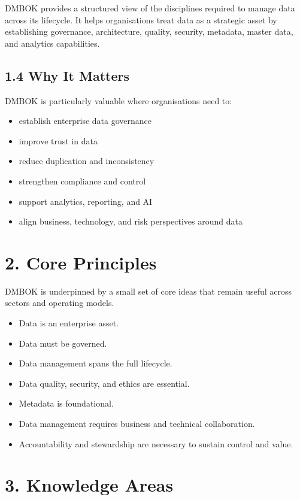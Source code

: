 \documentclass[
  letterpaper,
  DIV=11,
  numbers=noendperiod]{scrartcl}
\providecommand{\tightlist}{%
  \setlength{\itemsep}{0pt}\setlength{\parskip}{0pt}}
\begin{document}
DMBOK provides a structured view of the disciplines required to manage
data across its lifecycle. It helps organisations treat data as a
strategic asset by establishing governance, architecture, quality,
security, metadata, master data, and analytics capabilities.

\subsection{1.4 Why It Matters}\label{why-it-matters}

DMBOK is particularly valuable where organisations need to:

\begin{itemize}
\tightlist
\item
  establish enterprise data governance
\item
  improve trust in data
\item
  reduce duplication and inconsistency
\item
  strengthen compliance and control
\item
  support analytics, reporting, and AI
\item
  align business, technology, and risk perspectives around data
\end{itemize}

\section{2. Core Principles}\label{core-principles}

DMBOK is underpinned by a small set of core ideas that remain useful
across sectors and operating models.

\begin{itemize}
\tightlist
\item
  Data is an enterprise asset.
\item
  Data must be governed.
\item
  Data management spans the full lifecycle.
\item
  Data quality, security, and ethics are essential.
\item
  Metadata is foundational.
\item
  Data management requires business and technical collaboration.
\item
  Accountability and stewardship are necessary to sustain control and
  value.
\end{itemize}

\section{3. Knowledge Areas}\label{knowledge-areas}
\end{document}
